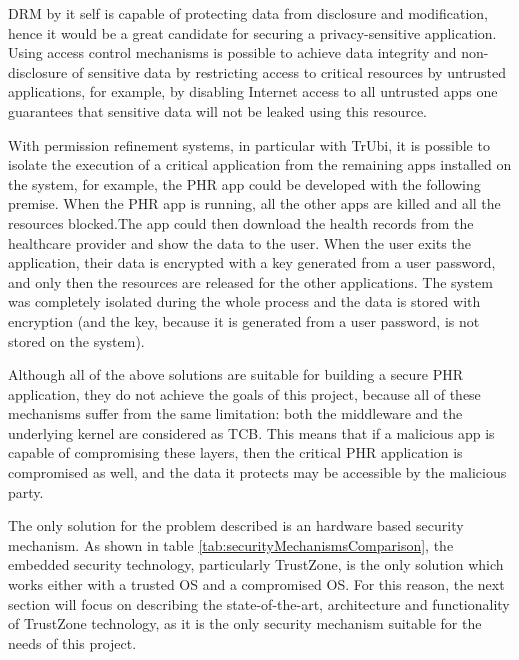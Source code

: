 \ac{DRM} by it self is capable of protecting data from disclosure and modification, hence it would be a great candidate for securing a privacy-sensitive application. Using access control mechanisms is possible to achieve data integrity and non-disclosure of sensitive data by restricting access to critical resources by untrusted applications, for example, by disabling Internet access to all untrusted apps one guarantees that sensitive data will not be leaked using this resource.

With permission refinement systems, in particular with TrUbi, it is possible to isolate the execution of a critical application from the remaining apps installed on the system, for example, the \ac{PHR} app could be developed with the following premise. When the \ac{PHR} app is running, all the other apps are killed and all the resources blocked.The app could then download the health records from the healthcare provider and show the data to the user. When the user exits the application, their data is encrypted with a key generated from a user password, and only then the resources are released for the other applications. The system was completely isolated during the whole process and the data is stored with encryption (and the key, because it is generated from a user password, is not stored on the system).

Although all of the above solutions are suitable for building a secure \ac{PHR} application, they do not achieve the goals of this project, because all of these mechanisms suffer from the same limitation: both the middleware and the underlying kernel are considered as \ac{TCB}. This means that if a malicious app is capable of compromising these layers, then the critical \ac{PHR} application is compromised as well, and the data it protects may be accessible by the malicious party. 

The only solution for the problem described is an hardware based security mechanism. As shown in table \ref{tab:securityMechanismsComparison}, the embedded security technology, particularly TrustZone, is the only solution which works either with a trusted OS and a compromised OS. For this reason, the next section will focus on describing the state-of-the-art, architecture and functionality of TrustZone technology, as it is the only security mechanism suitable for the needs of this project.

